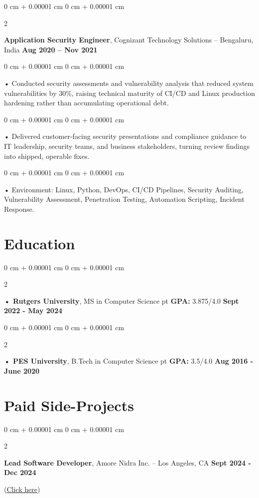 \documentclass[10pt, letterpaper]{article}
\newenvironment{onecolentry}{
    \begin{adjustwidth}{
        0 cm + 0.00001 cm
    }{
        0 cm + 0.00001 cm
    }
}{
    \end{adjustwidth}
} %
\newenvironment{twocolentry}[2][]{
    \onecolentry
    \def\secondColumn{#2}
    \setcolumnwidth{\fill, 4.5 cm}
    \begin{paracol}{2}
}{
    \switchcolumn \raggedleft \secondColumn
    \end{paracol}
    \endonecolentry
} %
\begin{document}
        \begin{twocolentry}{
            \textbf{Aug 2020 – Nov 2021}
        }
            \vspace{2 pt }
            \textbf{Application Security Engineer}, Cognizant Technology Solutions -- Bengaluru, India\end{twocolentry}
        \begin{onecolentry}
             • Conducted security assessments and vulnerability analysis that reduced system vulnerabilities by 30\%, raising technical maturity of CI/CD and Linux production hardening rather than accumulating operational debt.
        \end{onecolentry}
        \begin{onecolentry}
             • Delivered customer-facing security presentations and compliance guidance to IT leadership, security teams, and business stakeholders, turning review findings into shipped, operable fixes.
        \end{onecolentry}
        \begin{onecolentry}
             • Environment: Linux, Python, DevOps, CI/CD Pipelines, Security Auditing, Vulnerability Assessment, Penetration Testing, Automation Scripting, Incident Response.
        \end{onecolentry}
    \vspace{2 pt }
        \section{Education}
        \vspace{2 pt }
        \begin{twocolentry}{
            \textbf{Sept 2022 - May 2024}
        }
            \textbf{ • Rutgers University}, MS in Computer Science  pt \textbf{GPA:} 3.875/4.0  \end{twocolentry}

        \begin{twocolentry}{
            \textbf{Aug 2016 - June 2020}
        }
            \textbf{ • PES University}, B.Tech in Computer Science  pt \textbf{GPA:} 3.5/4.0  \end{twocolentry}

                        \vspace{0.4cm}
    \section{Paid Side-Projects}
            \vspace{2 pt }
        \begin{twocolentry}{
            \textbf{Sept 2024 - Dec 2024}
        }
            \textbf{Lead Software Developer}, Amore Nidra Inc. -- Los Angeles, CA\end{twocolentry}(\href{https://amorenidra.com}{Click here})
\end{document}
